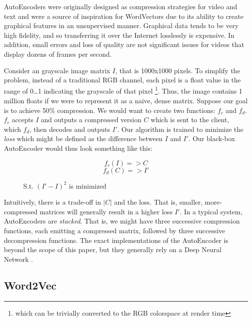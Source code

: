 \par{
AutoEncoders were originally designed as compression strategies for video and text and were a source of inspiration for WordVectors due to its ability to create graphical features in an unsupervised manner. Graphical data tends to be very high fidelity, and so transferring it over the Internet losslessly is expensive. In addition, small errors and loss of quality are not significant issues for videos that display dozens of frames per second.
}
\par{
Consider an grayscale image matrix $I$, that is \textsf{1000x1000} pixels. To simplify the problem, instead of a traditional RGB channel, each pixel is a float value in the range of 0\ldots1 indicating the grayscale of that pixel \footnote{which can be trivially converted to the RGB colorspace at render time}. Thus, the image contains 1 million floats if we were to represent it as a naive, dense matrix. Suppose our goal is to achieve 50\% compression. We would want to create two functions: $f_c$ and $f_d$. $f_c$ accepts $I$ and outputs a compressed version $C$ which is sent to the client, which $f_d$, then decodes and outputs $I'$. Our algorithm is trained to minimize the \textit{loss} which might be defined as the difference between $I$ and $I'$. Our black-box AutoEncoder would thus look something like this:
}

\begin{figure}
\[f_c(I) => C \]
\[ f_d(C) => I' \]
\caption{S.t. $(I' - I)^2$ is minimized}
\end{figure}

\par{
Intuitively, there is a trade-off in $|C|$ and the loss. That is, smaller, more-compressed matrices will generally result in a higher loss $I'$. In a typical system, AutoEncoders are \textit{stacked}. That is, we might have three successive compression functions, each emitting a compressed matrix, followed by three successive decompression functions. The exact implementations of the AutoEncoder is beyond the scope of this paper, but they generally rely on a Deep Neural Network \cite{tensorflow}.
}

\subsection{Word2Vec}

